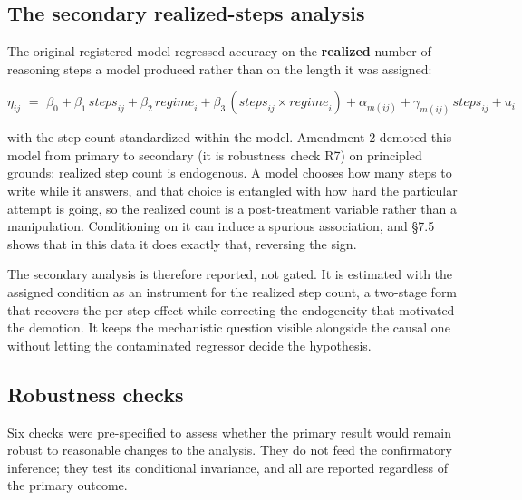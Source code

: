 \documentclass{article}
\begin{document}
\subsection{The secondary realized-steps
analysis}\label{the-secondary-realized-steps-analysis}

The original registered model regressed accuracy on the
\textbf{realized} number of reasoning steps a model produced rather than
on the length it was assigned:

\[\eta_{ij}\mspace{6mu} = \mspace{6mu}\beta_{0} + \beta_{1}\,{steps}_{ij} + \beta_{2}\,{regime}_{i} + \beta_{3}\,({steps}_{ij} \times {regime}_{i}) + \alpha_{m(ij)} + \gamma_{m(ij)}\,{steps}_{ij} + u_{i}\]

with the step count standardized within the model. Amendment 2 demoted
this model from primary to secondary (it is robustness check R7) on
principled grounds: realized step count is endogenous. A model chooses
how many steps to write while it answers, and that choice is entangled
with how hard the particular attempt is going, so the realized count is
a post-treatment variable rather than a manipulation. Conditioning on it
can induce a spurious association, and \S{}7.5 shows that in this data it
does exactly that, reversing the sign.

The secondary analysis is therefore reported, not gated. It is estimated
with the assigned condition as an instrument for the realized step
count, a two-stage form that recovers the per-step effect while
correcting the endogeneity that motivated the demotion. It keeps the
mechanistic question visible alongside the causal one without letting
the contaminated regressor decide the hypothesis.

\subsection{Robustness checks}\label{robustness-checks}

Six checks were pre-specified to assess whether the primary result would
remain robust to reasonable changes to the analysis. They do not feed
the confirmatory inference; they test its conditional invariance, and
all are reported regardless of the primary outcome.
\end{document}
